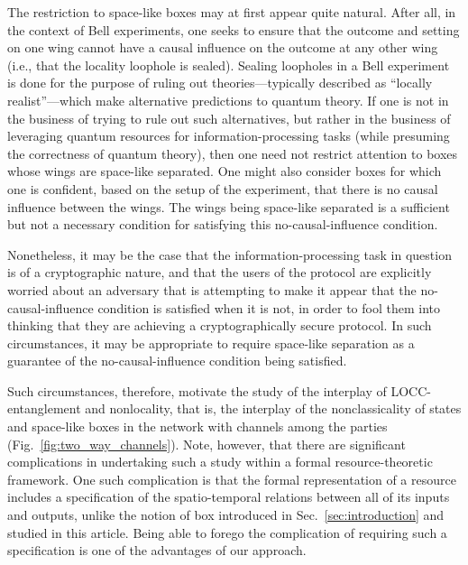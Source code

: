 \documentclass[12pt]{article}
\newcommand{\rob}{\color{black}}
\newcommand{\blk}{\color{black}}
\theoremstyle{plain}
\theoremstyle{definition}
\begin{document}
The restriction to space-like boxes
may at first appear quite natural.  After all, in the context of Bell experiments, one seeks to ensure that the outcome and setting on one wing cannot have a causal influence on the outcome at any other wing 
  (i.e., that the locality loophole is sealed).  
Sealing loopholes in a Bell experiment is done for the purpose of ruling out theories---typically described as ``locally realist''---which make alternative predictions to quantum theory.
  If one is not in the business of trying to rule out such alternatives, 
 but rather in the business of leveraging
  quantum resources for information-processing tasks (while presuming
   the correctness of quantum theory), then one need not
     restrict attention to boxes whose wings are space-like separated.  One might also consider
      boxes for which one is confident, based on the setup of the experiment, that there is no causal influence between the wings.   The wings being space-like separated is a sufficient but not a necessary condition for satisfying this no-causal-influence condition.
 
Nonetheless, 
 it may be the case that the information-processing task in question is of a cryptographic nature, and that the users of the protocol are explicitly worried about an adversary that is attempting to make it appear  that the no-causal-influence condition is satisfied when it is not, in order to fool them into thinking that they are achieving a cryptographically secure protocol.  In such circumstances, it may be appropriate to require space-like separation as a guarantee of the no-causal-influence condition being satisfied. 
  

  \sloppy Such circumstances, therefore, motivate the study of the interplay of LOCC-entanglement and nonlocality, that is, the interplay of the nonclassicality of states and \rob space-like \blk boxes in the network with channels among the parties (Fig.~\ref{fig:two_way_channels}).
Note, however, that there are significant complications in undertaking
 such a study within a formal resource-theoretic framework.
\rob
 One such complication is that 
 the formal representation of a resource 
  includes
 a specification of the spatio-temporal relations between all of its inputs and outputs, unlike the notion of box introduced in Sec.~\ref{sec:introduction} and studied in this article.
Being able to forego the complication of requiring such a specification is one of the advantages of our approach.
\blk
\end{document}
